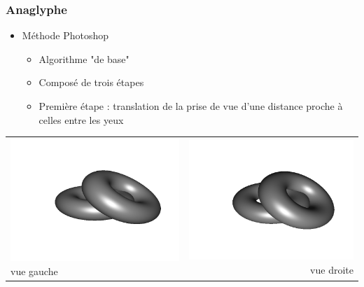 \documentclass{beamer}
\begin{document}
%

\begin{frame}
\frametitle{Anaglyphe}
\begin{itemize}[label=$\bullet$]
\item Méthode Photoshop \cite{stereoAnaglyph}
	\begin{itemize}[label=$\circ$]
	\item Algorithme "de base"
	\item Composé de trois étapes 
	\item Première étape : translation de la prise de vue d'une distance proche à celles entre les yeux 
	\end{itemize}
\end{itemize}
\begin{tabular}{l|r}
\includegraphics[scale=0.15]{flip1.png}
vue gauche
&
\includegraphics[scale=0.15]{flip2.png}
vue droite
\end{tabular}

\end{frame}
\end{document}
